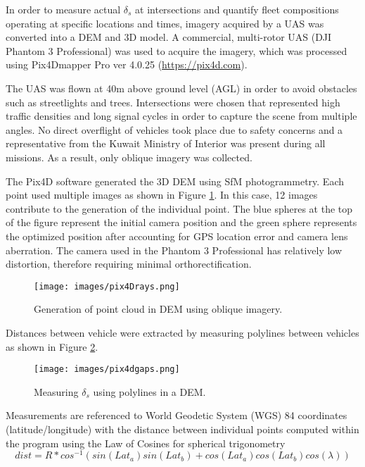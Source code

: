 In order to measure actual $\delta_{s}$ at intersections and quantify fleet compositions operating at specific locations and times, imagery acquired by a UAS was converted into a DEM and 3D model. A commercial, multi-rotor UAS (DJI Phantom 3 Professional) was used to acquire the imagery, which was processed using Pix4Dmapper Pro ver 4.0.25 (\url{https://pix4d.com}).

The UAS was flown at 40m above ground level (AGL) in order to avoid obstacles such as streetlights and trees. Intersections were chosen that represented high traffic densities and long signal cycles in order to capture the scene from multiple angles. No direct overflight of vehicles took place due to safety concerns and a representative from the Kuwait Ministry of Interior was present during all missions. As a result, only oblique imagery was collected. 

The Pix4D software generated the 3D DEM using SfM photogrammetry. Each point used multiple images as shown in Figure \ref{fig:pix4Drays}. In this case, 12 images contribute to the generation of the individual point. The blue spheres at the top of the figure represent the initial camera position and the green sphere represents the optimized position after accounting for GPS location error and camera lens aberration. The camera used in the Phantom 3 Professional has relatively low distortion, therefore requiring minimal orthorectification.
%
\begin{figure}[H]
\texttt{[image: images/pix4Drays.png]} 
\caption{Generation of point cloud in DEM using oblique imagery.}
\label{fig:pix4Drays}
\end{figure}
%

Distances between vehicle were extracted by measuring polylines between vehicles as shown in Figure \ref{fig:pix4Dgaps}.
%
\begin{figure}[H]
\texttt{[image: images/pix4dgaps.png]} 
\caption{Measuring $\delta_{s}$ using polylines in a DEM.}
\label{fig:pix4Dgaps}
\end{figure}
%
Measurements are referenced to World Geodetic System (WGS) 84 coordinates (latitude/longitude) with the distance between individual points computed within the program using the Law of Cosines for spherical trigonometry \citep{Sinnott1984}
%
\begin{equation}
\label{eq:distTrig}
dist = R * cos^{-1}(sin(Lat_{a})sin(Lat_{b}) + cos(Lat_{a})cos(Lat_{b})cos(\lambda))
\end{equation}

